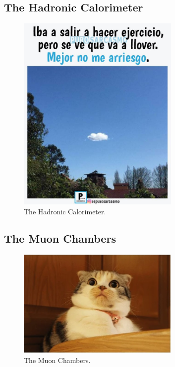 \subsection{The Hadronic Calorimeter}


\begin{figure}[!h]
  \centering
  \includegraphics[width=0.7\textwidth]{../images/ch2/8}
  \caption[The Hadronic Calorimeter]{The Hadronic Calorimeter.}\label{fig:cms_layout}
\end{figure}


\subsection{The Muon Chambers}
\begin{figure}[!h]
  \centering
  \includegraphics[width=0.7\textwidth]{../images/ch2/9}
  \caption[The Muon Chambers]{The Muon Chambers.}\label{fig:cms_layout}
\end{figure}

